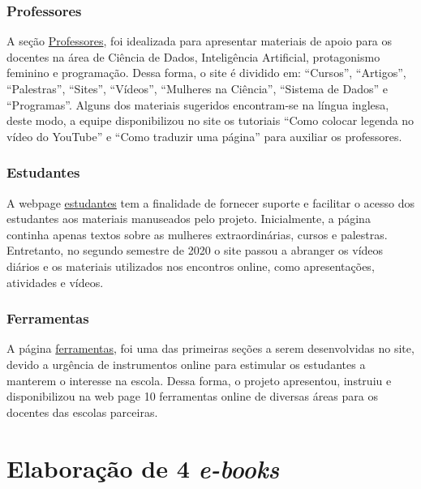 \documentclass[
]{book}
\begin{document}
\hypertarget{professores}{%
\subsection*{Professores}\label{professores}}

A seção \href{https://cienciadedadosep.wixsite.com/professores}{Professores}, foi idealizada para apresentar materiais de apoio para os docentes na área de Ciência de Dados, Inteligência Artificial, protagonismo feminino e programação. Dessa forma, o site é dividido em: ``Cursos'', ``Artigos'', ``Palestras'', ``Sites'', ``Vídeos'', ``Mulheres na Ciência'', ``Sistema de Dados'' e ``Programas''.
Alguns dos materiais sugeridos encontram-se na língua inglesa, deste modo, a equipe disponibilizou no site os tutoriais ``Como colocar legenda no vídeo do YouTube'' e ``Como traduzir uma página'' para auxiliar os professores.

\hypertarget{estudantes}{%
\subsection*{Estudantes}\label{estudantes}}

A webpage \href{https://cienciadedadosep.wixsite.com/estudantes}{estudantes} tem a finalidade de fornecer suporte e facilitar o acesso dos estudantes aos materiais manuseados pelo projeto. Inicialmente, a página continha apenas textos sobre as mulheres extraordinárias, cursos e palestras. Entretanto, no segundo semestre de 2020 o site passou a abranger os vídeos diários e os materiais utilizados nos encontros online, como apresentações, atividades e vídeos.

\hypertarget{ferramentas}{%
\subsection*{Ferramentas}\label{ferramentas}}

A página \href{https://cienciadedadosep.wixsite.com/cdep/ferramentas}{ferramentas}, foi uma das primeiras seções a serem desenvolvidas no site, devido a urgência de instrumentos online para estimular os estudantes a manterem o interesse na escola. Dessa forma, o projeto apresentou, instruiu e disponibilizou na web page 10 ferramentas online de diversas áreas para os docentes das escolas parceiras.

\hypertarget{ebooks}{%
\chapter{\texorpdfstring{Elaboração de 4 \emph{e-books}}{Elaboração de 4 e-books}}\label{ebooks}}
\end{document}
